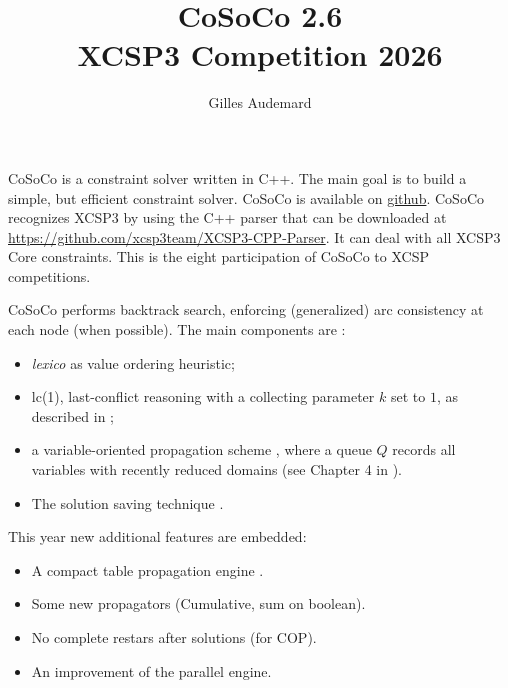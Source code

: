 \documentclass{llncs}
\newcommand{\h}[1]{\textit{#1}} %
\begin{document}
    \pagestyle{empty}


    \title{CoSoCo 2.6\\ {\small XCSP3 Competition 2026}}

    \author{Gilles Audemard}



    \maketitle




    CoSoCo is a constraint solver written in
    C++. The main goal is to build
    a simple, but efficient constraint solver. CoSoCo is available on
    \href{https://github.com/xcsp3team/cosoco}{github}. CoSoCo recognizes XCSP3
    \cite{BLPPxcsp3} by using the C++ parser that can be downloaded at
    \href{https://github.com/xcsp3team/XCSP3-CPP-Parser}{https://github.com/xcsp3team/XCSP3-CPP-Parser}. It
    can deal with all XCSP3 Core constraints.
    This is the eight participation of CoSoCo to XCSP competitions.

    \bigskip
    CoSoCo performs backtrack search, enforcing (generalized) arc consistency at each node (when possible).
    The main components are :
    \begin{itemize}
        \item \h{lexico} as value ordering heuristic;
        \item lc(1), last-conflict reasoning with a collecting parameter $k$ set to $1$, as described in \cite{LSTV_reasonning};
        \item a variable-oriented propagation scheme \cite{G_relational}, where a queue $Q$ records all variables with recently reduced domains (see Chapter 4 in \cite{L_constraint}).
        \item The solution saving technique \cite{vion2017}.
    \end{itemize}



    This year new additional features are embedded:
    \begin{itemize}
        \item A compact table propagation engine \cite{DHLPPRS_efficiently}.
        \item Some new propagators (Cumulative, sum on boolean).
        \item No complete restars after solutions (for COP).
        \item An improvement of the parallel engine.
    \end{itemize}
\end{document}
